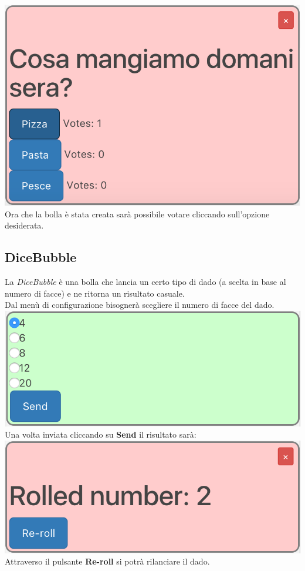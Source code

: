 \includegraphics[scale=0.74]{img/poll.png}
\\
Ora che la bolla è stata creata sarà possibile votare cliccando sull'opzione desiderata.
\subsection{DiceBubble}
La \textit{DiceBubble} è una bolla che lancia un certo tipo di dado (a scelta in base al numero di facce) e ne ritorna un risultato casuale.\\
Dal menù di configurazione bisognerà scegliere il numero di facce del dado.\\

\includegraphics[scale=0.75]{img/randConfig.png}
\\
Una volta inviata cliccando su \textbf{Send} il risultato sarà:\\

\includegraphics[scale=0.75]{img/rand.png}
\\
Attraverso il pulsante \textbf{Re-roll} si potrà rilanciare il dado.

